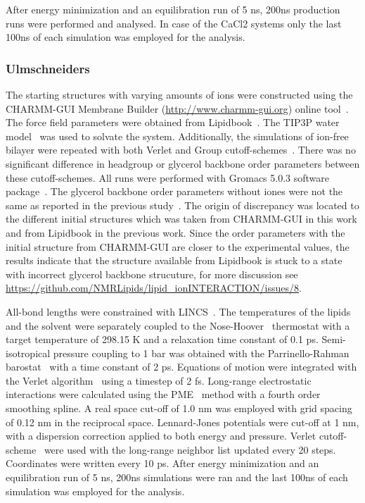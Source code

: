 \documentclass[pre,aps,floatfix,authordate1-4,twocolumn]{revtex4-1}
\begin{document}
After energy minimization and an equilibration run of 5 ns, 200ns production runs were performed and analysed. In case of the CaCl2 systems 
only the last 100ns of each simulation was employed for the analysis.

\subsubsection{Ulmschneiders}
The starting structures with varying amounts of ions were constructed using the CHARMM-GUI Membrane Builder (\url{http://www.charmm-gui.org}) 
online tool~\cite{lee15}. The force field parameters were obtained from Lipidbook~\cite{domanski10}. The TIP3P water model~\cite{jorgensen83} 
was used to solvate the system.  Additionally, the simulations of ion-free bilayer were repeated with both Verlet and Group cutoff-schemes~\cite{ulmschneiderPOPC0mMNaClfiles}. 
There was no significant difference in headgroup or glycerol backbone order parameters between these cutoff-schemes. All runs were performed with Gromacs 5.0.3 software package~\cite{abraham15}. 
The glycerol backbone order parameters without iones were not the same as reported in the previous study~\cite{botan15}.
The origin of discrepancy was located to the different initial structures which was taken from CHARMM-GUI in this work
and from Lipidbook in the previous work. Since the order parameters with the initial structure from CHARMM-GUI are
closer to the experimental values, the results indicate that the structure available from Lipidbook is stuck to a
state with incorrect glycerol backbone strucuture, for more discussion see \url{https://github.com/NMRLipids/lipid_ionINTERACTION/issues/8}.

All-bond lengths were constrained with LINCS~\cite{hess97,hess07}. The temperatures of the lipids and the solvent were separately coupled to the Nose-Hoover~\cite{nose84,hoover85} 
thermostat with a target temperature of 298.15 K and a relaxation time constant of 0.1 ps. Semi-isotropical pressure coupling to 1 bar was obtained 
with the Parrinello-Rahman barostat~\cite{parrinello81} with a time constant of 2 ps. Equations of motion were integrated with the Verlet algorithm~\cite{pall13} using a 
timestep of 2 fs. Long-range electrostatic interactions were calculated using the PME~\cite{darden93,essman95} method with a fourth order smoothing spline. 
A real space cut-off of 1.0 nm was employed with grid spacing of 0.12 nm in the reciprocal space. Lennard-Jones potentials were cut-off at 1 nm, 
with a dispersion correction applied to both energy and pressure. Verlet cutoff-scheme~\cite{pall13} were used with the long-range neighbor list updated 
every 20 steps. Coordinates were written every 10 ps. After energy minimization and an equilibration run of 5 ns, 200ns simulations were ran and 
the last 100ns of each simulation was employed for the analysis.
\end{document}
